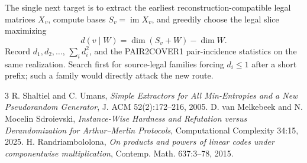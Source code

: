 \documentclass[11pt]{article}
\begin{document}
The single next target is to extract the earliest reconstruction-compatible legal matrices $X_v$, compute bases $S_v=\operatorname{im}X_v$, and greedily choose the legal slice maximizing
\[
d(v\mid W)=\dim(S_v+W)-\dim W.
\]
Record $d_1,d_2,\ldots$, $\sum_i d_i^2$, and the PAIR2COVER1 pair-incidence statistics on the same realization. Search first for source-legal families forcing $d_i\le1$ after a short prefix; such a family would directly attack the new route.

\begin{thebibliography}{3}
 R. Shaltiel and C. Umans, \emph{Simple Extractors for All Min-Entropies and a New Pseudorandom Generator}, J. ACM 52(2):172--216, 2005.
 D. van Melkebeek and N. Mocelin Sdroievski, \emph{Instance-Wise Hardness and Refutation versus Derandomization for Arthur--Merlin Protocols}, Computational Complexity 34:15, 2025.
 H. Randriambololona, \emph{On products and powers of linear codes under componentwise multiplication}, Contemp. Math. 637:3--78, 2015.
\end{thebibliography}
\end{document}
